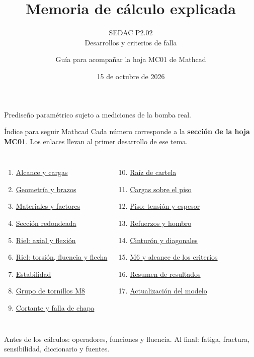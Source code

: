 \documentclass[10pt,aspectratio=169]{beamer}
\title{Memoria de cálculo explicada}
\subtitle{SEDAC P2.02\\Desarrollos y criterios de falla}
\author{Guía para acompañar la hoja MC01 de Mathcad}
\date{15 de octubre de 2026}
\newcommand{\mcref}{Guía de lectura}
\begin{document}
\spanishplainpercent
\gdef\mcref{Guía de lectura}
\begin{frame}[label=inicio]
 \titlepage
 \vspace{-5mm}
 \begin{center}
  \small Prediseño paramétrico sujeto a mediciones de la bomba real.
 \end{center}
\end{frame}

\begin{frame}[t,label=mapa]{Índice para seguir Mathcad}
\small
Cada número corresponde a la \textbf{sección de la hoja MC01}.
Los enlaces llevan al primer desarrollo de ese tema.
\medskip
\begin{columns}[T,onlytextwidth]
\begin{enumerate}
 \item \hyperlink{mc01}{Alcance y cargas}
 \item \hyperlink{mc02}{Geometría y brazos}
 \item \hyperlink{mc03}{Materiales y factores}
 \item \hyperlink{mc04}{Sección redondeada}
 \item \hyperlink{mc05}{Riel: axial y flexión}
 \item \hyperlink{mc06}{Riel: torsión, fluencia y flecha}
 \item \hyperlink{mc07}{Estabilidad}
 \item \hyperlink{mc08}{Grupo de tornillos M8}
 \item \hyperlink{mc09}{Cortante y falla de chapa}
\end{enumerate}
\begin{enumerate}
 \setcounter{enumi}{9}
 \item \hyperlink{mc10}{Raíz de cartela}
 \item \hyperlink{mc11}{Cargas sobre el piso}
 \item \hyperlink{mc12}{Piso: tensión y espesor}
 \item \hyperlink{mc13}{Refuerzos y hombro}
 \item \hyperlink{mc14}{Cinturón y diagonales}
 \item \hyperlink{mc15}{M6 y alcance de los criterios}
 \item \hyperlink{mc16}{Resumen de resultados}
 \item \hyperlink{mc17}{Actualización del modelo}
\end{enumerate}
\end{columns}
\medskip
\footnotesize
Antes de los cálculos: operadores, funciones y fluencia.
Al final: fatiga, fractura, sensibilidad, diccionario y fuentes.
\end{frame}
\end{document}
